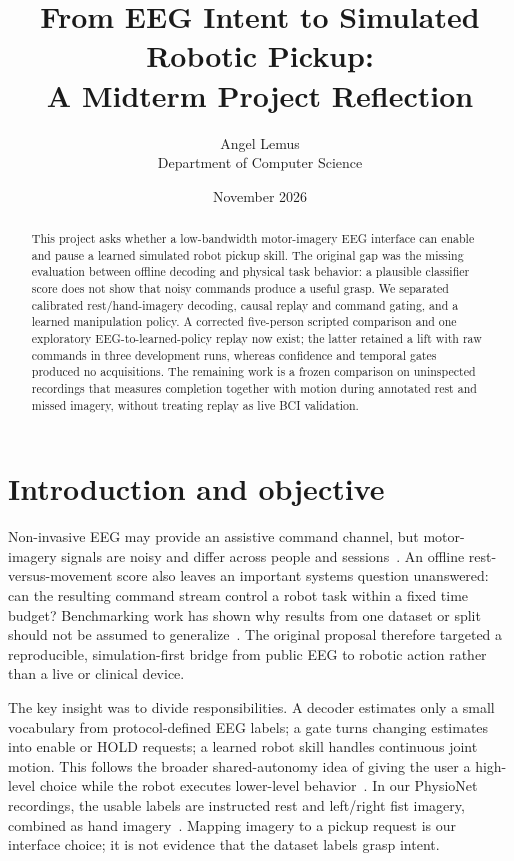 \documentclass[11pt]{article}
\title{From EEG Intent to Simulated Robotic Pickup:\\A Midterm Project Reflection}
\author{Angel Lemus\\\small Department of Computer Science}
\date{November 2026}
\begin{document}
\maketitle
\vspace{-1.4em}

\begin{abstract}
This project asks whether a low-bandwidth motor-imagery EEG interface can enable and pause a learned simulated robot pickup skill. The original gap was the missing evaluation between offline decoding and physical task behavior: a plausible classifier score does not show that noisy commands produce a useful grasp. We separated calibrated rest/hand-imagery decoding, causal replay and command gating, and a learned manipulation policy. A corrected five-person scripted comparison and one exploratory EEG-to-learned-policy replay now exist; the latter retained a lift with raw commands in three development runs, whereas confidence and temporal gates produced no acquisitions. The remaining work is a frozen comparison on uninspected recordings that measures completion together with motion during annotated rest and missed imagery, without treating replay as live BCI validation.
\end{abstract}

\section{Introduction and objective}
Non-invasive EEG may provide an assistive command channel, but motor-imagery signals are noisy and differ across people and sessions~\citep{mcfarland2017,lotte2018}. An offline rest-versus-movement score also leaves an important systems question unanswered: can the resulting command stream control a robot task within a fixed time budget? Benchmarking work has shown why results from one dataset or split should not be assumed to generalize~\citep{jayaram2018}. The original proposal therefore targeted a reproducible, simulation-first bridge from public EEG to robotic action rather than a live or clinical device.

The key insight was to divide responsibilities. A decoder estimates only a small vocabulary from protocol-defined EEG labels; a gate turns changing estimates into enable or HOLD requests; a learned robot skill handles continuous joint motion. This follows the broader shared-autonomy idea of giving the user a high-level choice while the robot executes lower-level behavior~\citep{akinola2017}. In our PhysioNet recordings, the usable labels are instructed rest and left/right fist imagery, combined as hand imagery~\citep{schalk2009}. Mapping imagery to a pickup request is our interface choice; it is not evidence that the dataset labels grasp intent.
\end{document}
